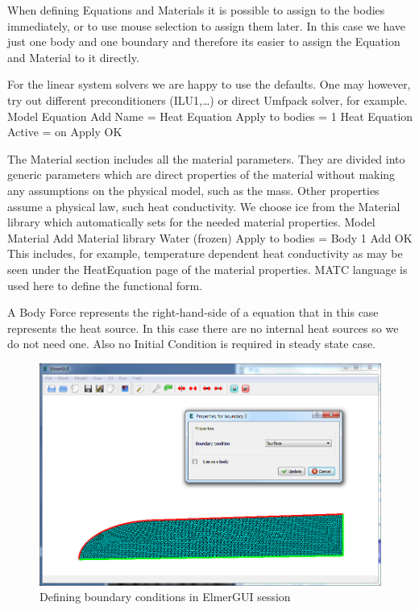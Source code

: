 When defining Equations and Materials it is possible to assign to the bodies immediately, or to use mouse
selection to assign them later. In this case we have just one body and one boundary and therefore its easier to assign 
the Equation and Material to it directly.

For the linear system solvers we are happy to use the defaults. One may however, try out different
preconditioners (ILU1,\ldots) or direct Umfpack solver, for example.
\ttbegin
Model
  Equation
    Add 
      Name = Heat Equation
      Apply to bodies = 1
      Heat Equation
        Active = on
  Apply   
  OK
\ttend        

The Material section includes all the material parameters.
They are divided into generic parameters which are direct properties of the material
without making any assumptions on the physical model, such as the mass. Other properties assume
a physical law, such heat conductivity.
We choose ice from the Material library which automatically sets for the needed material properties. 
\ttbegin
Model
  Material
    Add 
      Material library
        Water (frozen)
      Apply to bodies = Body 1 
      Add 
      OK
\ttend
This includes, for example, temperature dependent heat conductivity as may be seen under the HeatEquation page of
the material properties. MATC language is used here to define the functional form.


A Body Force represents the right-hand-side of a equation that in this case represents
the heat source. In this case there are no internal heat sources so we do not need one.
Also no Initial Condition is required in steady state case.

\begin{figure}
\begin{center}
\includegraphics[width=120mm]{glacier_toy_gui}
\caption{Defining boundary conditions in ElmerGUI session}\label{glac:bc}
\end{center}
\end{figure}


